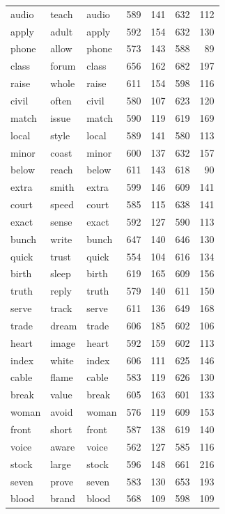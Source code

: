 \documentclass[
]{interact}
\begin{document}
\begin{longtable*}{lllrrrr}
audio & teach & audio & 589 & 141 & 632 & 112 \\ 
apply & adult & apply & 592 & 154 & 632 & 130 \\ 
phone & allow & phone & 573 & 143 & 588 & 89 \\ 
class & forum & class & 656 & 162 & 682 & 197 \\ 
raise & whole & raise & 611 & 154 & 598 & 116 \\ 
civil & often & civil & 580 & 107 & 623 & 120 \\ 
match & issue & match & 590 & 119 & 619 & 169 \\ 
local & style & local & 589 & 141 & 580 & 113 \\ 
minor & coast & minor & 600 & 137 & 632 & 157 \\ 
below & reach & below & 611 & 143 & 618 & 90 \\ 
extra & smith & extra & 599 & 146 & 609 & 141 \\ 
court & speed & court & 585 & 115 & 638 & 141 \\ 
exact & sense & exact & 592 & 127 & 590 & 113 \\ 
bunch & write & bunch & 647 & 140 & 646 & 130 \\ 
quick & trust & quick & 554 & 104 & 616 & 134 \\ 
birth & sleep & birth & 619 & 165 & 609 & 156 \\ 
truth & reply & truth & 579 & 140 & 611 & 150 \\ 
serve & track & serve & 611 & 136 & 649 & 168 \\ 
trade & dream & trade & 606 & 185 & 602 & 106 \\ 
heart & image & heart & 592 & 159 & 602 & 113 \\ 
index & white & index & 606 & 111 & 625 & 146 \\ 
cable & flame & cable & 583 & 119 & 626 & 130 \\ 
break & value & break & 605 & 163 & 601 & 133 \\ 
woman & avoid & woman & 576 & 119 & 609 & 153 \\ 
front & short & front & 587 & 138 & 619 & 140 \\ 
voice & aware & voice & 562 & 127 & 585 & 116 \\ 
stock & large & stock & 596 & 148 & 661 & 216 \\ 
seven & prove & seven & 583 & 130 & 653 & 193 \\ 
blood & brand & blood & 568 & 109 & 598 & 109 \\ 

\end{longtable*}
\end{document}
